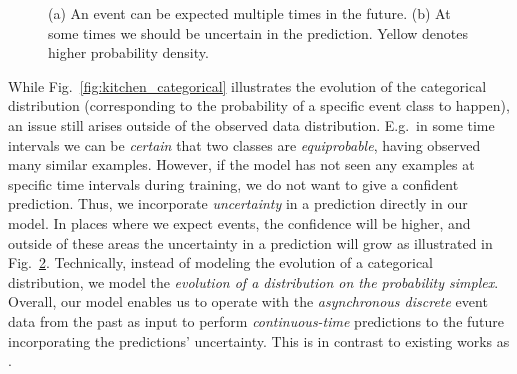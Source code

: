 \begin{figure}
\begin{subfigure}{.4 \linewidth}
                \vspace*{-0.6cm}
                \caption{}
                \label{fig:kitchen_uncertainty}
        \end{subfigure}
        \vspace{-0.2cm}
        \caption{(a) An event can be expected multiple times in the future. (b) At some times we should be uncertain in the prediction. Yellow denotes higher probability density.}
        \vspace*{-0.6cm}
\end{figure}
While Fig.\ \ref{fig:kitchen_categorical} illustrates the evolution of the categorical distribution (corresponding to the probability of a specific event class to happen), an issue still arises outside of the observed data distribution. {E.g.\ in some time intervals we can be \textit{certain} that two classes are \textit{equiprobable}, having observed many similar examples. However,} if the model has not seen any examples at specific time intervals during training, we do not want to give a confident prediction. Thus, we incorporate \textit{uncertainty} in a prediction directly in our model. In places where we expect events, the confidence will be higher, and outside of these areas the uncertainty in a prediction will grow as illustrated in Fig.\ \ref{fig:kitchen_uncertainty}. Technically, instead of modeling the evolution of a categorical distribution, we model the \textit{evolution of a distribution on the probability simplex}.
%
Overall, our model enables us to operate with the \textit{asynchronous discrete} event data from the past as input to perform \textit{continuous-time} predictions to the future incorporating the predictions' uncertainty. This is in contrast to existing works as \cite{RMTPP, hawkes}.
